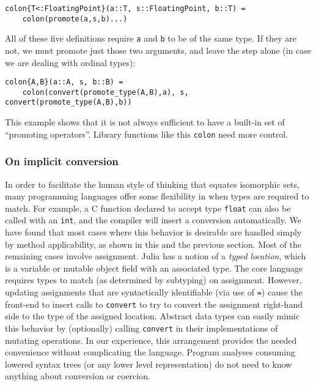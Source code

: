 \begin{verbatim}
colon{T<:FloatingPoint}(a::T, s::FloatingPoint, b::T) =
    colon(promote(a,s,b)...)
\end{verbatim}

All of these five definitions require \texttt{a} and \texttt{b} to be of the
same type. If they are not, we must promote just those two arguments, and leave
the step alone (in case we are dealing with ordinal types):

\begin{verbatim}
colon{A,B}(a::A, s, b::B) =
    colon(convert(promote_type(A,B),a), s, convert(promote_type(A,B),b))
\end{verbatim}

This example shows that it is not always sufficient to have a built-in set of
``promoting operators''. Library functions like this \texttt{colon} need more
control.

\subsubsection{On implicit conversion}

In order to facilitate the human style of thinking that equates
isomorphic sets, many programming languages offer some flexibility
in when types are required to match.
For example, a C function declared to accept type \texttt{float}
can also be called with an \texttt{int}, and the compiler will
insert a conversion automatically.
We have found that most cases where this behavior is desirable
are handled simply by method applicability, as shown in this and the
previous section.
Most of the remaining cases involve assignment.
Julia has a notion of a \emph{typed location}, which is a variable
or mutable object field with an associated type.
The core language requires types to match (as determined by subtyping)
on assignment.
However, updating assignments that are syntactically identifiable
(via use of \texttt{=}) cause the front-end to insert calls to
\texttt{convert} to try to convert the assignment right-hand side
to the type of the assigned location.
Abstract data types can easily mimic this behavior by (optionally)
calling \texttt{convert} in their implementations of mutating
operations.
In our experience, this arrangement provides the needed convenience
without complicating the language.
Program analyses consuming lowered syntax trees (or any lower level
representation) do not need to know anything about conversion
or coercion.

